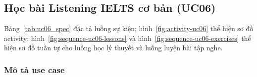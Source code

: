 \subsection{Học bài Listening IELTS cơ bản (UC06)}
Bảng~\ref{tab:uc06_spec} đặc tả luồng sự kiện; hình~\ref{fig:activity-uc06} thể hiện sơ đồ activity; hình~\ref{fig:sequence-uc06-lessons} và hình~\ref{fig:sequence-uc06-exercises} thể hiện sơ đồ tuần tự cho luồng học lý thuyết và luồng luyện bài tập nghe.
\subsubsection{Mô tả use case}
\renewcommand{\arraystretch}{1.3}
\setlength{\tbu}{\dimexpr(\linewidth - 4\tabcolsep - 3\arrayrulewidth)/2\relax}
